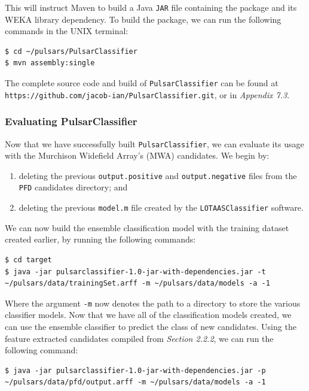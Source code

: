 \documentclass{article}
\begin{document}
This will instruct Maven to build a Java \verb|JAR| file containing the package and its WEKA library dependency. To build the package, we can run the following commands in the UNIX terminal:

\begin{lstlisting}[numbers=none]
$ cd ~/pulsars/PulsarClassifier
$ mvn assembly:single
\end{lstlisting}

The complete source code and build of \verb|PulsarClassifier| can be found at \verb|https://github.com/jacob-ian/PulsarClassifier.git|, or in \emph{Appendix 7.3}.

\subsubsection{Evaluating PulsarClassifier}

Now that we have successfully built \verb|PulsarClassifier|, we can evaluate its usage with the Murchison Widefield Array's (MWA) candidates. We begin by:
\begin{enumerate}[label=\roman*.] 
    \item deleting the previous \verb|output.positive| and \verb|output.negative| files from the \verb|PFD| candidates directory; and
    \item deleting the previous \verb|model.m| file created by the \verb|LOTAASClassifier| software.
\end{enumerate}

We can now build the ensemble classification model with the training dataset created earlier, by running the following commands:

\begin{lstlisting}[numbers=none]
$ cd target
$ java -jar pulsarclassifier-1.0-jar-with-dependencies.jar -t ~/pulsars/data/trainingSet.arff -m ~/pulsars/data/models -a -1
\end{lstlisting}

Where the argument \verb|-m| now denotes the path to a directory to store the various classifier models. Now that we have all of the classification models created, we can use the ensemble classifier to predict the class of new candidates. Using the feature extracted candidates compiled from \emph{Section 2.2.2}, we can run the following command:

\begin{lstlisting}[numbers=none]
$ java -jar pulsarclassifier-1.0-jar-with-dependencies.jar -p ~/pulsars/data/pfd/output.arff -m ~/pulsars/data/models -a -1
\end{lstlisting}
\end{document}

